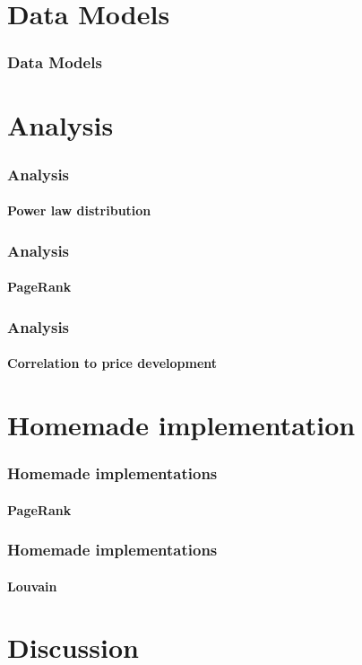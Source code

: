 \documentclass[aspectratio=169]{beamer}
\begin{document}
\section{Data Models}
\begin{frame}[t]
    \frametitle{Data Models}
\end{frame}
\section{Analysis}
\begin{frame}[t]
    \frametitle{Analysis}
    \framesubtitle{Power law distribution}
\end{frame}
\begin{frame}[t]
    \frametitle{Analysis}
    \framesubtitle{PageRank}
\end{frame}
\begin{frame}[t]
    \frametitle{Analysis}
    \framesubtitle{Correlation to price development}
\end{frame}
\section{Homemade implementation}
\begin{frame}[t]
    \frametitle{Homemade implementations}
    \framesubtitle{PageRank}
    
\end{frame}
\begin{frame}[t]
    \frametitle{Homemade implementations}
    \framesubtitle{Louvain}
    
\end{frame}
\section{Discussion}
\end{document}
